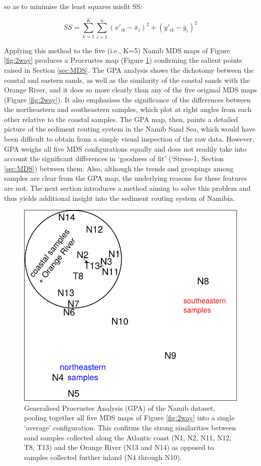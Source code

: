 \documentclass{article}
\begin{document}
so as to minimise the least squares misfit SS:

\begin{equation}
SS = \sum\limits_{k=1}^{K} \sum\limits_{i=1}^{n} (x'_{ik}-\bar{x}_{i})^2 + (y'_{ik}-\bar{y}_{i})^2
\label{eq:procrustes}
\end{equation}

Applying this method to the five (i.e., K=5) Namib MDS maps of Figure
\ref{fig:2way} produces a Procrustes map (Figure \ref{fig:procrustes})
confirming the salient points raised in Section \ref{sec:MDS}.  The
GPA analysis shows the dichotomy between the coastal and eastern
sands, as well as the similarity of the coastal sands with the Orange
River, and it does so more clearly than any of the five original MDS
maps (Figure \ref{fig:2way}). It also emphasises the significance of
the differences between the northeastern and southeastern samples,
which plot at right angles from each other relative to the coastal
samples. The GPA map, then, paints a detailed picture of the sediment
routing system in the Namib Sand Sea, which would have been difficult
to obtain from a simple visual inspection of the raw data. However,
GPA weighs all five MDS configurations equally and does not readily
take into account the significant differences in `goodness of fit'
(`Stress-1, Section \ref{sec:MDS}) between them.  Also, although the
trends and groupings among samples are clear from the GPA map, the
underlying reasons for these features are not. The next section
introduces a method aiming to solve this problem and thus yields
additional insight into the sediment routing system of Namibia.

\begin{figure}[!ht]
\centering
\includegraphics[width=.6\textwidth]{procrustes3.png}
\caption{Generalised Procrustes Analysis (GPA) of the Namib dataset,
  pooling together all five MDS maps of Figure \ref{fig:2way} into a
  single `average' configuration. This confirms the strong
  similarities between sand samples collected along the Atlantic coast
  (N1, N2, N11, N12, T8, T13) and the Orange River (N13 and N14) as
  opposed to samples collected further inland (N4 through N10).}
\label{fig:procrustes}
\end{figure}
\end{document}
